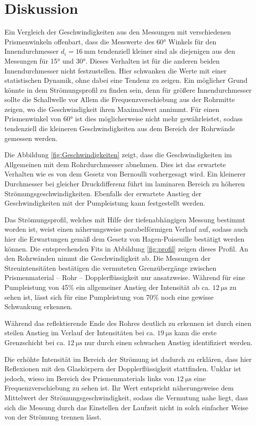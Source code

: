 \section{Diskussion}
\label{sec:Diskussion}
Ein Vergleich der Geschwindigkeiten aus den Messungen mit verschiedenen Prismenwinkeln offenbart, dass die Messwerte des 60° Winkels für den Innendurchmesser $d_i = \SI{16}{\milli\meter}$ tendenziell kleiner sind als diejenigen aus den Messungen für 15° und 30°. Dieses Verhalten ist für die anderen beiden Innendurchmesser nicht festzustellen. Hier schwanken die Werte mit einer statistischen Dynamik, ohne dabei eine Tendenz zu zeigen. Ein möglicher Grund könnte in dem Strömungsprofil zu finden sein, denn für größere Innendurchmesser sollte die Schallwelle vor Allem die Frequenzverschiebung aus der Rohrmitte zeigen, wo die Geschwindigkeit ihren Maximalwert annimmt. Für einen Prismenwinkel von 60° ist dies möglicherweise nicht mehr gewährleistet, sodass tendenziell die kleineren Geschwindigkeiten aus dem Bereich der Rohrwände gemessen werden.

Die Abbildung \ref{fig:Geschwindigkeiten} zeigt, dass die Geschwindigkeiten im Allgemeinen mit dem Rohrdurchmesser abnehmen. Dies ist das erwartete Verhalten wie es von dem Gesetz von Bernoulli vorhergesagt wird. Ein kleinerer Durchmesser bei gleicher Druckdifferenz führt im laminaren Bereich zu höheren Strömungsgeschwindigkeiten. Ebenfalls der erwartete Anstieg der Geschwindigkeiten mit der Pumpleistung kann festgestellt werden.

Das Strömungsprofil, welches mit Hilfe der tiefenabhängigen Messung bestimmt worden ist, weist einen näherungsweise parabelförmigen Verlauf auf, sodass auch hier die Erwartungen gemäß dem Gesetz von Hagen-Poiseuille bestätigt werden können. Die entsprechenden Fits in Abbildung \ref{fig:profil} zeigen dieses Profil. An den Rohrwänden nimmt die Geschwindigkeit ab. Die Messungen der Streuintensitäten bestätigen die vermuteten Grenzübergänge zwischen Prismenmaterial -- Rohr -- Dopplerflüssigkeit nur ansatzweise. Während für eine Pumpleistung von 45\% ein allgemeiner Anstieg der Intensität ab ca. $\SI{12}{\micro\second}$ zu sehen ist, lässt sich für eine Pumpleistung von 70\% noch eine gewisse Schwankung erkennen.

Während das reflektierende Ende des Rohres deutlich zu erkennen ist durch einen steilen Anstieg im Verlauf der Intensitäten bei ca. $\SI{19}{\micro\second}$ kann die erste Grenzschicht bei ca. $\SI{12}{\micro\second}$ nur durch einen schwachen Anstieg identifiziert werden.

Die erhöhte Intensität im Bereich der Strömung ist dadurch zu erklären, dass hier Reflexionen mit den Glaskörpern der Dopplerflüssigkeit stattfinden. Unklar ist jedoch, wieso im Bereich des Prismenmaterials links von $\SI{12}{\micro\second}$ eine Frequenzverschiebung zu sehen ist. Ihr Wert entspricht näherungsweise dem Mittelwert der Strömungsgeschwindigkeit, sodass die Vermutung nahe liegt, dass sich die Messung durch das Einstellen der Laufzeit nicht in solch einfacher Weise von der Strömung trennen lässt.
